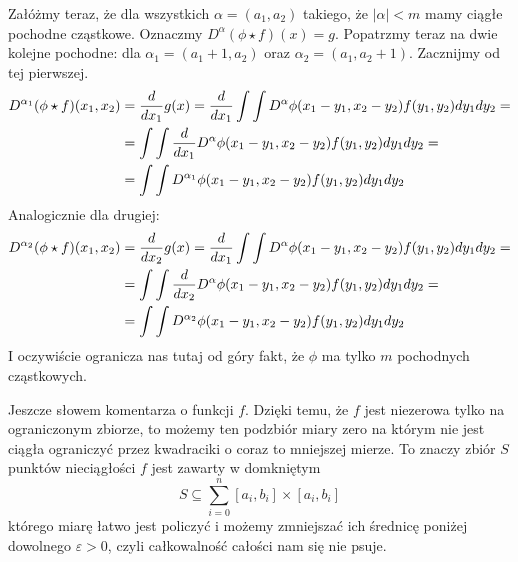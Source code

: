 \documentclass{article}
\begin{document}
Załóżmy teraz, że dla wszystkich $\alpha=(a_1,a_2)$ takiego, że $|\alpha|<m$ mamy ciągłe pochodne cząstkowe. Oznaczmy $D^\alpha(\phi\star f)(x)=g$. Popatrzmy teraz na dwie kolejne pochodne: dla $\alpha_1=(a_1+1,a_2)$ oraz $\alpha_2=(a_1,a_2+1)$. Zacznijmy od tej pierwszej.
\begin{align*}
    D^{\alpha_1}(\phi\star f)(x_1,x_2)&={d\over dx_1}g(x)={d\over dx_1}\int\int D^\alpha \phi(x_1-y_1,x_2-y_2)f(y_1,y_2)dy_1dy_2=\\
    &=\int\int{d\over dx_1}D^\alpha\phi(x_1-y_1,x_2-y_2)f(y_1,y_2)dy_1dy_2=\\
    &=\int\int D^{\alpha_1}\phi(x_1-y_1,x_2-y_2)f(y_1,y_2)dy_1dy_2
\end{align*}
Analogicznie dla drugiej:
\begin{align*}
    D^{\alpha_2}(\phi\star f)(x_1,x_2)&={d\over dx_2}g(x)={d\over dx_1}\int\int D^\alpha \phi(x_1-y_1,x_2-y_2)f(y_1,y_2)dy_1dy_2=\\
    &=\int\int{d\over dx_2}D^\alpha\phi(x_1-y_1,x_2-y_2)f(y_1,y_2)dy_1dy_2=\\
    &=\int\int D^{\alpha_2}\phi(x_1-y_1,x_2-y_2)f(y_1,y_2)dy_1dy_2
\end{align*}
I oczywiście ogranicza nas tutaj od góry fakt, że $\phi$ ma tylko $m$ pochodnych cząstkowych.
\medskip

Jeszcze słowem komentarza o funkcji $f$. Dzięki temu, że $f$ jest niezerowa tylko na ograniczonym zbiorze, to możemy ten podzbiór miary zero na którym nie jest ciągła ograniczyć przez kwadraciki o coraz to mniejszej mierze. To znaczy zbiór $S$ punktów nieciągłości $f$ jest zawarty w domkniętym
$$S\subseteq\sum\limits_{i=0}^n[a_i,b_i]\times[a_i,b_i]$$
którego miarę łatwo jest policzyć i możemy zmniejszać ich średnicę poniżej dowolnego $\varepsilon>0$, czyli całkowalność całości nam się nie psuje.
\bigskip
\end{document}
